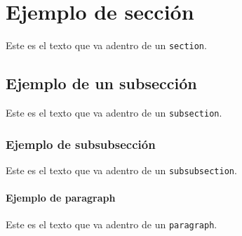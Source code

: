 \section{Ejemplo de sección} \label{Ejemplo_seccion}
Este es el texto que va adentro de un {\tt section}.
\subsection{Ejemplo de un subsección}
Este es el texto que va adentro de un {\tt subsection}.
\subsubsection{Ejemplo de subsubsección}
Este es el texto que va adentro de un {\tt subsubsection}.
\paragraph{Ejemplo de paragraph}
Este es el texto que va adentro de un {\tt paragraph}.